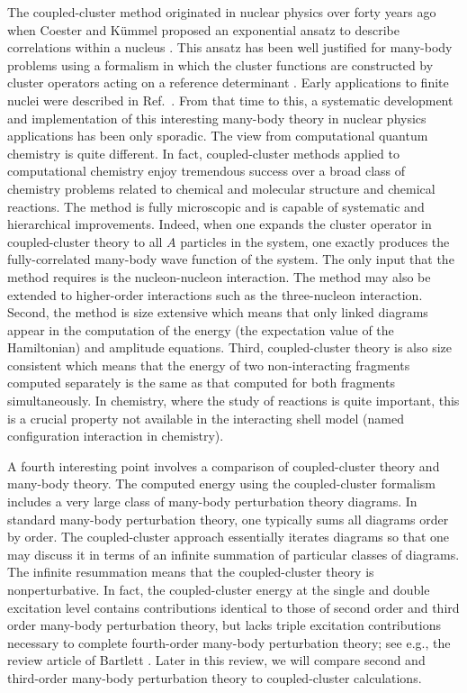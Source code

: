 \documentclass{article}
\begin{document}
The coupled-cluster method originated in nuclear physics over
forty years ago when Coester and K\"ummel proposed an exponential ansatz
to describe correlations within a nucleus
\cite{coester58,coester60}. This ansatz has been well justified
for many-body problems using a formalism in which the
cluster functions are constructed by cluster operators acting on
a reference determinant \cite{harris92}. Early applications
to finite nuclei were described in Ref.~\cite{klz78}. From that
time to this, a systematic development and implementation
of this interesting many-body theory in nuclear
physics applications has been only sporadic. The view from
computational quantum chemistry is quite different.
In fact, coupled-cluster methods applied to computational chemistry
enjoy tremendous success
\cite{bartlett81,comp_chem_rev00,piotr1,helgaker,arponen97}
over a broad class of
chemistry problems related to chemical and
molecular structure and chemical reactions.
The method is fully
microscopic and is capable of systematic and hierarchical improvements.
Indeed, when one expands the cluster operator in coupled-cluster theory
to all $A$ particles in the system, one exactly produces the fully-correlated
many-body wave function of the system. The only input that the method
requires is the nucleon-nucleon interaction.
The method may also be extended
to higher-order interactions such as the three-nucleon interaction.
Second, the method is size extensive which means that only linked
diagrams appear in the computation of the
energy (the expectation value of the Hamiltonian) and amplitude equations.
Third, coupled-cluster theory is also size
consistent which means that the energy of two non-interacting fragments
computed separately is the same as that computed for both fragments
simultaneously. In chemistry, where the study of reactions
is quite important, this is a crucial property not available
in the interacting shell model (named configuration interaction in
chemistry).

A fourth interesting point involves a comparison of 
coupled-cluster theory and many-body theory. 
The computed energy using the coupled-cluster formalism includes 
a very large class of many-body perturbation theory diagrams.
In standard many-body perturbation theory, one typically sums
all diagrams order by order. The coupled-cluster approach essentially
iterates diagrams so that one may discuss it in terms of an infinite
summation of particular classes of diagrams. The infinite resummation
means that the coupled-cluster theory is nonperturbative. In fact, the 
coupled-cluster energy at the single and double excitation level
contains contributions identical to
those of second order and third order many-body perturbation theory, but
lacks triple excitation contributions necessary to complete fourth-order
many-body perturbation theory; see e.g., the review article of
Bartlett \cite{bartlett81}. Later in this review, we will compare 
second and third-order many-body perturbation theory to coupled-cluster
calculations. 
\end{document}
